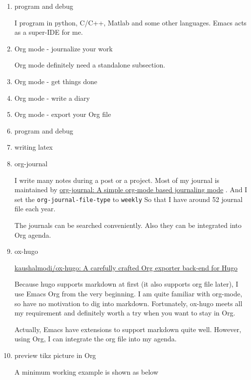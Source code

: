 \documentclass[koma,utopia,letterpaper,captions=tableheading,11pt,listings-sv,microtype,paralist,colorlinks=true,urlcolor=blue]{org-article}
\begin{document}
\begin{enumerate}
\item program and debug
\label{sec:orgb2fe87f}


I program in python, C/C++, Matlab and some other languages. Emacs acts as a
super-IDE for me.


\item Org mode - journalize your work
\label{sec:orgeea2f15}


Org mode definitely need a standalone subsection.

\item Org mode - get things done
\label{sec:orgc04d679}



\item Org mode - write a diary
\label{sec:orgfef1783}

\item Org mode - export your Org file
\label{sec:org4bcf25c}


\item program and debug
\label{sec:org1802ebb}


\item writing latex
\label{sec:orgbcbd545}
\item org-journal
\label{sec:orgef55573}


I write many notes during a post or a project. Most of my journal is maintained
by \href{https://github.com/bastibe/org-journal}{org-journal: A simple org-mode based journaling mode} . And I set the
\texttt{org-journal-file-type} to \texttt{weekly} So that I have around 52 journal file each
year.

The journals can be searched conveniently. Also they can be integrated into Org
agenda.


\item ox-hugo
\label{sec:org5381774}


\href{https://github.com/kaushalmodi/ox-hugo}{kaushalmodi/ox-hugo: A carefully crafted Org exporter back-end for Hugo}

Because hugo supports markdown at first (it also supports org file later), I use
Emacs Org from the very beginning. I am quite familiar with org-mode, so have no
motivation to dig into markdown. Fortunately, ox-hugo meets all my requirement
and definitely worth a try when you want to stay in Org.

Actually, Emacs have extensions to support markdown quite well. However, using
Org, I can integrate the org file into my agenda.


\item preview tikz picture in Org
\label{sec:org9189e37}


A minimum working example is shown as below
\end{enumerate}
\end{document}
